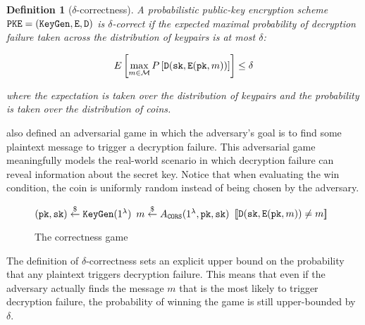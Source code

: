 \documentclass{article}
\newtheorem{definition}{Definition}[section]
\begin{document}
\begin{definition}[$\delta$-correctness]\label{def:delta-correctness}
    A probabilistic public-key encryption scheme $\texttt{PKE} = (\texttt{KeyGen}, \texttt{E}, \texttt{D})$ is $\delta$-correct if the expected maximal probability of decryption failure taken across the distribution of keypairs is at most $\delta$:

    \begin{equation*}
        E\left\lbrack\max_{m \in \mathcal{M}} P\left\lbrack
            \texttt{D}(\texttt{sk}, \texttt{E}(\texttt{pk}, m))
        \right\rbrack
        \right\rbrack \leq \delta
    \end{equation*}

    where the expectation is taken over the distribution of keypairs and the probability is taken over the distribution of coins.
\end{definition}

\cite{hofheinz2017modular} also defined an adversarial game in which the adversary's goal is to find some plaintext message to trigger a decryption failure. This adversarial game meaningfully models the real-world scenario in which decryption failure can reveal information about the secret key. Notice that when evaluating the win condition, the coin is uniformly random instead of being chosen by the adversary.

\begin{figure}[H]
    \center

    \begin{minipage}{0.5\textwidth}
        \begin{algorithm}[H]
            \caption{}
            \begin{algorithmic}[1]
                \State $(\texttt{pk}, \texttt{sk}) \stackrel{\$}{\leftarrow} \texttt{KeyGen}(1^\lambda)$
                \State $m \stackrel{\$}{\leftarrow} A_\texttt{CORS}(1^\lambda, \texttt{pk}, \texttt{sk})$
                \State \Return $[\![ \texttt{D}(\texttt{sk}, \texttt{E}(\texttt{pk}, m)) \neq m ]\!]$
            \end{algorithmic}
        \end{algorithm}
    \end{minipage}
    
    \caption{The correctness game }\label{fig:cors-game}
\end{figure}

The definition of $\delta$-correctness sets an explicit upper bound on the probability that any plaintext triggers decryption failure. This means that even if the  adversary actually finds the message $m$ that is the most likely to trigger decryption failure, the probability of winning the  game is still upper-bounded by $\delta$.
\end{document}
